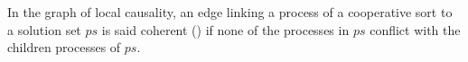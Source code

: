\begin{comment}
\begin{definition}
  \label{def:aS}
  The abstract structure $\cwB=(\Breq,\Bsol,\Brsp,\Bcont)$ is defined as
  $\cwB = \sfp{\aB^\w_\ctx}{\myB}{\aB^\w_{\ctx \Cap \allprocs_\ctx(\myB)}}$,\\
  with $\myB=(\myreq,\mysol,\myrsp,\mycont)$:
  \begin{align*}
    \myreq &= \{ (a_i,\PHobjp{a}{j}{i}) \in \PHproc \times \Obj \mid
      a \in \components \wedge a_j \in \PHget{\ctx}{a} \\ %
      & \qquad \wedge ((\exists (P,ps) \in \mysol \vee \exists (b_j, ps) \in \myrsp), a_i \in ps \\
      & \qquad\qquad \vee \exists n \in \indexes{\w}, \PHbounce(\w_n)=a_i) \}
    \\
    \mysol &\subseteq \{ (P,ps) \in \Obj \times \powerset(\PHproc) \mid
            \exists (a_i, P) \in \myreq \wedge ps \in \aBS(P) \\
      & \qquad\qquad \vee \exists (Q, P) \in \mycont \wedge ps \in \aBS(P) \}
    \\
    \myrsp &= \{ (a_i,ps) \in \PHproc \times \powerset(\PHproc) \mid a \in \cs \\
      & \qquad \wedge (\exists (P,ps') \in \mysol \vee \exists (b_j,ps') \in \myrsp), \\
      & \qquad\qquad a_i \in ps' \wedge \csState(a_i) \in ps \}
    \\
    \mycont & = \{ (P, \PHobj{q}{\PHbounce(P)}) \in \Obj \times \Obj \mid
      \exists (P, ps) \in \mysol \\
      & \qquad\qquad \wedge q \in \gCont_\ctx(\PHsort(P),P) \}
  \end{align*}
\end{definition}

\begin{definition}[Coherent solution]
\label{def:coherent}
  A cooperative sort requisite $(a_i, ps)$ in $\Brsp$ is said coherent iff
  it has no successor $(b_k,\PHobjp{b}{j}{k})$ in $\Breq$ so that there exists $b_n \in ps$, $b_k \neq b_n$.
\end{definition}
\end{comment}
%
In the graph of local causality, an edge linking a process of a cooperative sort to a solution set $ps$ is said coherent () if none of the processes in $ps$ conflict with the children processes of $ps$.
